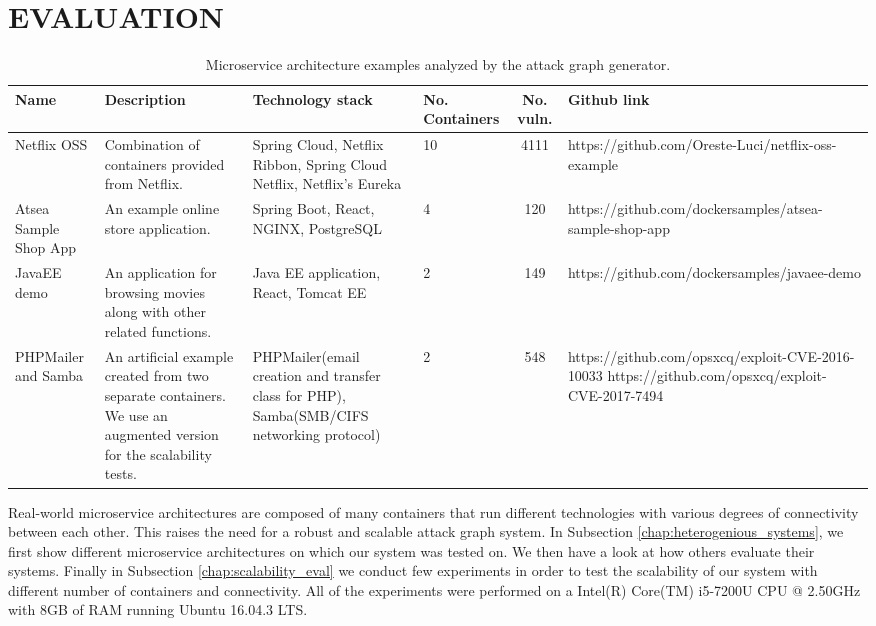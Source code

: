 \section{EVALUATION}

\begin{table*}
	\begin{center}
		\begin{tabular}{ |p{20mm}|p{25mm}|p{20mm}|p{10mm}|c|p{60mm}| } 
			\hline
			Name & Description & Technology stack & No. Containers & No. vuln. & Github link \\\hline 
			
			Netflix OSS & Combination of containers provided from Netflix. & Spring Cloud, Netflix Ribbon, Spring Cloud Netflix, Netflix's Eureka & 10 & 4111 & https://github.com/Oreste-Luci/netflix-oss-example \\\hline
			
			Atsea Sample Shop App & An example online store application. & Spring Boot, React, NGINX, PostgreSQL & 4 & 120 &  https://github.com/dockersamples/atsea-sample-shop-app \\\hline
			
			JavaEE demo & An application for browsing movies along with other related functions. & Java EE application, React, Tomcat EE & 2 & 149 &  https://github.com/dockersamples/javaee-demo \\\hline
			
			PHPMailer and Samba & An artificial example created from two separate containers. We use an augmented version for the scalability tests. & PHPMailer(email creation and transfer class for PHP), Samba(SMB/CIFS networking protocol) & 2 & 548 &  https://github.com/opsxcq/exploit-CVE-2016-10033
			https://github.com/opsxcq/exploit-CVE-2017-7494 \\\hline
			
			
			\hline
		\end{tabular}
	\end{center}
	
	\caption{Microservice architecture examples analyzed by the attack graph generator.}
	\label{table_technologies}
	
\end{table*}

Real-world microservice architectures are composed of many containers that run different technologies with various degrees of connectivity between each other. This raises the need for a robust and scalable attack graph system. In Subsection \ref{chap:heterogenious_systems}, we first show different microservice architectures on which our system was tested on. We then have a look at how others evaluate their systems. Finally in Subsection \ref{chap:scalability_eval} we conduct few experiments in order to test the scalability of our system with different number of containers and connectivity. All of the experiments were performed on a Intel(R) Core(TM) i5-7200U CPU @ 2.50GHz with 8GB of RAM running Ubuntu 16.04.3 LTS.

